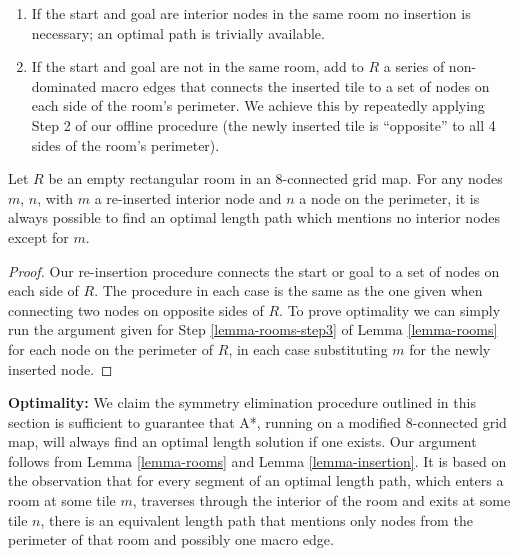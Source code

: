 \begin{enumerate}
\item{If the start and goal are interior nodes in the same room no insertion is necessary; an optimal
path is trivially available. }
\item{If the start and goal are not in the same room, add to $R$ a series of non-dominated macro edges that connects
the inserted tile to a set of nodes on each side of the room's perimeter. We achieve this by repeatedly applying Step 2
of our offline procedure (the newly inserted tile is ``opposite'' to all 4 sides of the room's perimeter).}
\end{enumerate}
\begin{lemma}
\label{lemma-insertion}
Let $R$ be an empty rectangular room in an 8-connected grid map.
For any nodes $m$, $n$, with $m$ a re-inserted interior node and $n$ a node on the perimeter, it is always possible to
find an optimal length path which mentions no interior nodes except for $m$.
\end{lemma}
\begin{proof}
Our re-insertion procedure connects the start or goal to a set of nodes on each side of $R$.
The procedure in each case is the same as the one given when connecting two nodes on opposite sides of $R$.
To prove optimality we can simply run the argument given for Step \ref{lemma-rooms-step3} of Lemma \ref{lemma-rooms} for each
node on the perimeter of $R$, in each case substituting $m$ for the newly inserted node.
\end{proof}

\par \noindent
\newline
\textbf{Optimality:} We claim the symmetry elimination procedure outlined in this section is sufficient to guarantee
that A*, running on a modified 8-connected grid map, will always find an optimal length solution if one exists.
Our argument follows from Lemma \ref{lemma-rooms} and Lemma \ref{lemma-insertion}.
It is based on the observation that for every segment of an optimal length path, which enters a room at some tile $m$,
traverses through the interior of the room and exits at some tile $n$, there is an equivalent length path that mentions only 
nodes from the perimeter of that room and possibly one macro edge.

